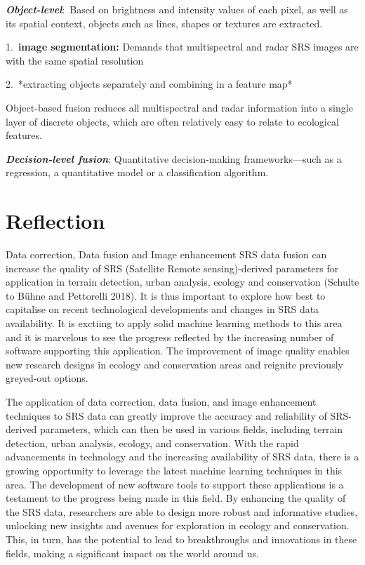 \documentclass[
  letterpaper,
  DIV=11,
  numbers=noendperiod]{scrreprt}
\begin{document}
\textbf{\emph{Object-level}}:~Based on brightness and intensity values
of each pixel, as well as its spatial context, objects such as lines,
shapes or textures are extracted.

1.~\textbf{image segmentation:} Demands that multispectral and radar SRS
images are with the same spatial resolution

2.~*extracting objects separately and combining in a feature map*

Object-based fusion reduces all multispectral and radar information into
a single layer of discrete objects, which are often relatively easy to
relate to ecological features.

\textbf{\emph{Decision-level fusion}}: Quantitative decision-making
frameworks---such as a regression, a quantitative model or a
classification algorithm.

\hypertarget{reflection-1}{%
\section{Reflection}\label{reflection-1}}

Data correction, Data fusion and Image enhancement SRS data fusion can
increase the quality of SRS (Satellite Remote sensing)-derived
parameters for application in terrain detection, urban analysis, ecology
and conservation (Schulte to Bühne and Pettorelli 2018). It is thus
important to explore how best to capitalise on recent technological
developments and changes in SRS data availability. It is exctiing to
apply solid machine learning methods to this area and it is marvelous to
see the progress reflected by the increasing number of software
supporting this application. The improvement of image quality enables
new research designs in ecology and conservation areas and reignite
previously greyed-out options.

The application of data correction, data fusion, and image enhancement
techniques to SRS data can greatly improve the accuracy and reliability
of SRS-derived parameters, which can then be used in various fields,
including terrain detection, urban analysis, ecology, and conservation.
With the rapid advancements in technology and the increasing
availability of SRS data, there is a growing opportunity to leverage the
latest machine learning techniques in this area. The development of new
software tools to support these applications is a testament to the
progress being made in this field. By enhancing the quality of the SRS
data, researchers are able to design more robust and informative
studies, unlocking new insights and avenues for exploration in ecology
and conservation. This, in turn, has the potential to lead to
breakthroughs and innovations in these fields, making a significant
impact on the world around us.
\end{document}
